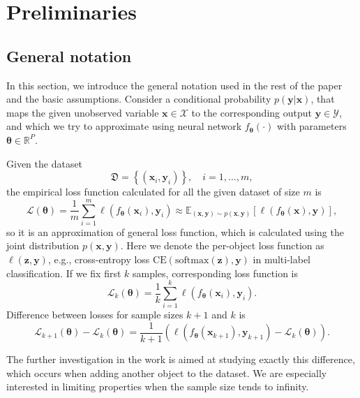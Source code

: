 \documentclass{article}
\begin{document}
\section{Preliminaries}\label{sec:prelim}

\subsection{General notation}

In this section, we introduce the general notation used in the rest of the paper and the basic assumptions. Consider a conditional probability $p(\mathbf{y}|\mathbf{x})$, that maps the given unobserved variable $\mathbf{x} \in \mathcal{X}$ to the corresponding output $\mathbf{y} \in \mathcal{Y}$, and which we try to approximate using neural network $f_{\boldsymbol{\theta}}(\cdot)$ with parameters $\boldsymbol{\theta} \in \mathbb{R}^{P}$.

Given the dataset
\[ \mathfrak{D} = \left\{ (\mathbf{x}_i, \mathbf{y}_i) \right\}, \quad i = 1, \ldots, m, \]
the empirical loss function calculated for all the given dataset of size $m$ is
\[ \mathcal{L}(\boldsymbol{\theta}) = \dfrac{1}{m} \sum\limits_{i=1}^{m} \ell(f_{\boldsymbol{\theta}}(\mathbf{x}_i), \mathbf{y}_i) \approx \mathbb{E}_{(\mathbf{x}, \mathbf{y}) \sim p(\mathbf{x}, \mathbf{y})} \left[ \ell(f_{\boldsymbol{\theta}}(\mathbf{x}), \mathbf{y}) \right], \]
so it is an approximation of general loss function, which is calculated using the joint distribution $p(\mathbf{x}, \mathbf{y})$. Here we denote the per-object loss function as $\ell(\mathbf{z}, \mathbf{y})$, e.g., cross-entropy loss $\mathrm{CE}(\mathrm{softmax}(\mathbf{z}), \mathbf{y})$ in multi-label classification. If we fix first $k$ samples, corresponding loss function is
\[ \mathcal{L}_k(\boldsymbol{\theta}) = \dfrac{1}{k} \sum\limits_{i=1}^{k} \ell(f_{\boldsymbol{\theta}}(\mathbf{x}_i), \mathbf{y}_i). \]
Difference between losses for sample sizes $k+1$ and $k$ is
\begin{equation}\label{eq:difference}
    \mathcal{L}_{k+1}(\boldsymbol{\theta}) - \mathcal{L}_k(\boldsymbol{\theta}) = \dfrac{1}{k+1} \left( \ell(f_{\boldsymbol{\theta}}(\mathbf{x}_{k+1}), \mathbf{y}_{k+1}) - \mathcal{L}_{k}(\boldsymbol{\theta}) \right).
\end{equation}

The further investigation in the work is aimed at studying exactly this difference, which occurs when adding another object to the dataset. We are especially interested in limiting properties when the sample size tends to infinity.
\end{document}
